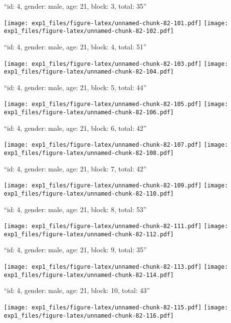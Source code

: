 \documentclass[11pt,,]{article}
\begin{document}
\newpage
[1] 

``id: 4, gender: male, age: 21, block: 3, total: 35''

\texttt{[image: exp1\_files/figure-latex/unnamed-chunk-82-101.pdf]}
\texttt{[image: exp1\_files/figure-latex/unnamed-chunk-82-102.pdf]}

\newpage
[1] 

``id: 4, gender: male, age: 21, block: 4, total: 51''

\texttt{[image: exp1\_files/figure-latex/unnamed-chunk-82-103.pdf]}
\texttt{[image: exp1\_files/figure-latex/unnamed-chunk-82-104.pdf]}

\newpage
[1] 

``id: 4, gender: male, age: 21, block: 5, total: 44''

\texttt{[image: exp1\_files/figure-latex/unnamed-chunk-82-105.pdf]}
\texttt{[image: exp1\_files/figure-latex/unnamed-chunk-82-106.pdf]}

\newpage
[1] 

``id: 4, gender: male, age: 21, block: 6, total: 42''

\texttt{[image: exp1\_files/figure-latex/unnamed-chunk-82-107.pdf]}
\texttt{[image: exp1\_files/figure-latex/unnamed-chunk-82-108.pdf]}

\newpage
[1] 

``id: 4, gender: male, age: 21, block: 7, total: 42''

\texttt{[image: exp1\_files/figure-latex/unnamed-chunk-82-109.pdf]}
\texttt{[image: exp1\_files/figure-latex/unnamed-chunk-82-110.pdf]}

\newpage
[1] 

``id: 4, gender: male, age: 21, block: 8, total: 53''

\texttt{[image: exp1\_files/figure-latex/unnamed-chunk-82-111.pdf]}
\texttt{[image: exp1\_files/figure-latex/unnamed-chunk-82-112.pdf]}

\newpage
[1] 

``id: 4, gender: male, age: 21, block: 9, total: 35''

\texttt{[image: exp1\_files/figure-latex/unnamed-chunk-82-113.pdf]}
\texttt{[image: exp1\_files/figure-latex/unnamed-chunk-82-114.pdf]}

\newpage
[1] 

``id: 4, gender: male, age: 21, block: 10, total: 43''

\texttt{[image: exp1\_files/figure-latex/unnamed-chunk-82-115.pdf]}
\texttt{[image: exp1\_files/figure-latex/unnamed-chunk-82-116.pdf]}
\end{document}
